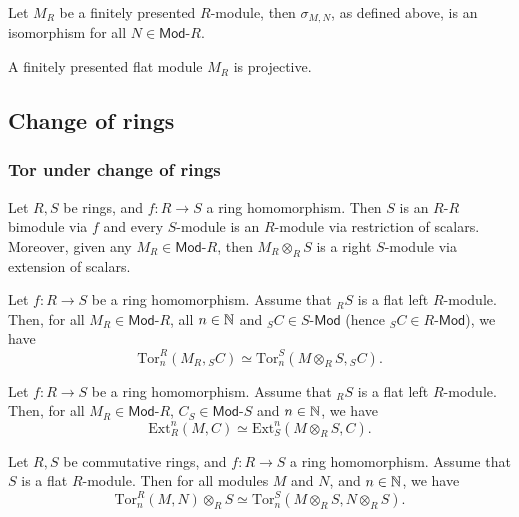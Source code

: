\begin{lem}
	Let $M_R$ be a finitely presented $R$-module,
	then $\sigma_{M,N}$, as defined above, is an isomorphism for all $N \in \mathsf{Mod}\text{-}R$.
\end{lem} 

\begin{thm}[]
	A finitely presented flat module $M_R$ is projective.
\end{thm}

\subsection{Change of rings}
\subsubsection{Tor under change of rings}
Let $R,S$ be rings, and $f\colon R \to S$ a ring homomorphism.
Then $S$ is an $R$-$R$ bimodule via $f$ and every $S$-module
is an $R$-module via restriction of scalars.
Moreover, given any $M_R \in \mathsf{Mod}\text{-}R$, then
$M_R \otimes_R S$ is a right $S$-module via extension of scalars.

\begin{prop}
	Let $f\colon R \to S$ be a ring homomorphism.
	Assume that ${}_RS$ is a flat left $R$-module.
	Then, for all $M_R \in \mathsf{Mod}\text{-}R$, all $n \in \mathbb{N}$
	and ${}_SC \in S\text{-}\mathsf{Mod}$
	(hence ${}_SC \in R\text{-}\mathsf{Mod}$), we have
	\begin{equation}
		\mathrm{Tor}^R_n (M_R, {}_SC) \simeq
		\mathrm{Tor}^S_n (M \otimes_R S, {}_SC)
	.\end{equation} 
\end{prop} 

\begin{prop}
	Let $f\colon R \to S$ be a ring homomorphism.
	Assume that ${}_RS$ is a flat left $R$-module.
	Then, for all $M_R \in \mathsf{Mod}\text{-}R$, $C_S \in \mathsf{Mod}\text{-}S$ and $n \in \mathbb{N}$,
	we have
	\begin{equation}
		\mathrm{Ext}^n_R (M, C) \simeq
		\mathrm{Ext}^n_S (M \otimes_R S, C)
	.\end{equation} 
\end{prop} 

\begin{prop}
	Let $R, S$ be commutative rings, and $f\colon R \to S$ a ring homomorphism.
	Assume that $S$ is a flat $R$-module.
	Then for all modules $M$ and $N$, and $n \in \mathbb{N}$, we have
	\begin{equation}
		\mathrm{Tor}^R_n (M,N) \otimes_R S \simeq
		\mathrm{Tor}^S_n (M \otimes_R S, N \otimes_R S)
	.\end{equation} 
\end{prop} 



